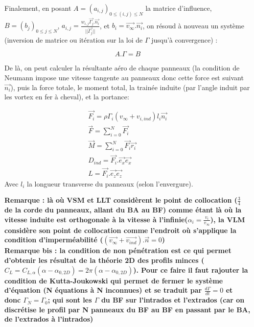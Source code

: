 Finalement, en posant $A = (a_{i,j})_{0 \leq (i,j) \leq N}$ la matrice d'influence, $B = (b_{j})_{0 \leq j \leq N}$, $a_{i,j} = \frac{w_{i,j}\overrightarrow{\Gamma_j}.\overrightarrow{n_i}}{||\overrightarrow{\Gamma_j}||}$, et $b_{i} = \overrightarrow{v_{\infty}}.\overrightarrow{n_i}$, on résoud à nouveau un système (inversion de matrice ou itération sur la loi de $\Gamma$ jusqu'à convergence) :

\begin{equation}
    A.\Gamma = B
    \label{eq : vlm gamma}
\end{equation}

De là, on peut calculer la résultante aéro de chaque panneaux (la condition de Neumann impose une vitesse tangente au panneaux donc cette force est suivant $\overrightarrow{n_i}$), puis la force totale, le moment total, la trainée induite (par l'angle induit par les vortex en fer à cheval), et la portance: 

\begin{equation}
    \begin{split}
        \overrightarrow{F_i} = \rho \Gamma_i(v_{\infty} + v_{i,ind})l_i \overrightarrow{n_i} \\
        \overrightarrow{F} = \sum_{i=0}^{N}\overrightarrow{F_i} \\
        \overrightarrow{M} = \sum_{i=0}^{N}\overrightarrow{F_i} \overrightarrow{r_i} \\
        D_{ind} = \overrightarrow{F_i}.\overrightarrow{e_x} \overrightarrow{e_x} \\
        L = \overrightarrow{F_i}.\overrightarrow{e_z} \overrightarrow{e_z}
    \end{split}
    \label{eq : vlm resultats}
\end{equation}
Avec $l_i$ la longueur transverse du panneaux (selon l'envergure).

\textbf{Remarque : là où VSM et LLT considèrent le point de collocation ($\frac{3}{4}$ de la corde du panneaux, allant du BA au BF) comme étant là où la vitesse induite est orthogonale à la vitesse à l'infinie($\alpha_i = \frac{v_i}{v_{\infty}}$), la VLM considère son point de collocation comme l'endroit où s'applique la condition d'imperméabilité ($(\overrightarrow{v_{\infty}} + \overrightarrow{v_{ind}}).\overrightarrow{n} = 0$)}\\

\textbf{Remarque bis : la condition de non pénétration est ce qui permet d'obtenir les résultat de la théorie 2D des profils minces ($C_L = C_{L, \alpha}(\alpha - \alpha_{0,2D}) = 2\pi (\alpha - \alpha_{0,2D})$). Pour ce faire il faut rajouter la condition de Kutta-Joukowski qui permet de fermer le système d'équation (N équations à N inconnues) et se traduit par $\frac{d\Gamma}{dt} = 0$ et donc $\Gamma_N = \Gamma_0$; qui sont les $\Gamma$ du BF sur l'intrados et l'extrados (car on discrétise le profil par N panneaux du BF au BF en passant par le BA, de l'extrados à l'intrados)}\\


